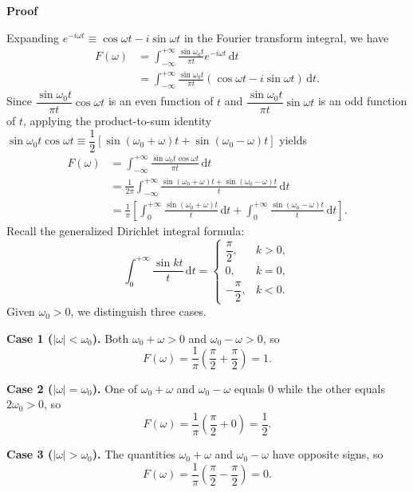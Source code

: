 \documentclass[11pt,a4paper]{article}
\theoremstyle{definition}
\theoremstyle{plain}
\begin{document}
\textbf{Proof}\par\nopagebreak[4]
Expanding $e^{-i\omega t} \equiv \cos \omega t - i\sin \omega t$ in the Fourier transform integral, we have
\begin{align*}
F(\omega) &= \int_{-\infty}^{+\infty} \frac{\sin \omega_0 t}{\pi t} e^{-i\omega t} \, \mathrm{d}t \\
&= \int_{-\infty}^{+\infty} \frac{\sin \omega_0 t}{\pi t} (\cos \omega t - i\sin \omega t) \, \mathrm{d}t.
\end{align*}
Since $\dfrac{\sin \omega_0 t}{\pi t} \cos \omega t$ is an even function of $t$ and $\dfrac{\sin \omega_0 t}{\pi t} \sin \omega t$ is an odd function of $t$, applying the product-to-sum identity $\sin \omega_0 t \cos \omega t \equiv \dfrac{1}{2}\left[\sin(\omega_0 + \omega)t + \sin(\omega_0 - \omega)t\right]$ yields
\begin{align*}
F(\omega) &= \int_{-\infty}^{+\infty} \frac{\sin \omega_0 t \cos \omega t}{\pi t} \, \mathrm{d}t \\
&= \frac{1}{2\pi} \int_{-\infty}^{+\infty} \frac{\sin(\omega_0 + \omega)t + \sin(\omega_0 - \omega)t}{t} \, \mathrm{d}t \\
&= \frac{1}{\pi} \left[ \int_{0}^{+\infty} \frac{\sin(\omega_0 + \omega)t}{t} \, \mathrm{d}t + \int_{0}^{+\infty} \frac{\sin(\omega_0 - \omega)t}{t} \, \mathrm{d}t \right].
\end{align*}
Recall the generalized Dirichlet integral formula:
\begin{equation}
\int_{0}^{+\infty} \frac{\sin kt}{t} \, \mathrm{d}t =
\begin{cases}
\dfrac{\pi}{2}, & k > 0, \\[10pt]
0, & k = 0, \\[8pt]
-\dfrac{\pi}{2}, & k < 0.
\end{cases}
\end{equation}
Given $\omega_0 > 0$, we distinguish three cases.

\textbf{Case 1 ($|\omega| < \omega_0$).} Both $\omega_0 + \omega > 0$ and $\omega_0 - \omega > 0$, so
\begin{equation}
F(\omega) = \frac{1}{\pi}\left(\frac{\pi}{2} + \frac{\pi}{2}\right) = 1.
\end{equation}

\textbf{Case 2 ($|\omega| = \omega_0$).} One of $\omega_0 + \omega$ and $\omega_0 - \omega$ equals $0$ while the other equals $2\omega_0 > 0$, so
\begin{equation}
F(\omega) = \frac{1}{\pi}\left(\frac{\pi}{2} + 0\right) = \frac{1}{2}.
\end{equation}

\textbf{Case 3 ($|\omega| > \omega_0$).} The quantities $\omega_0 + \omega$ and $\omega_0 - \omega$ have opposite signs, so
\begin{equation}
F(\omega) = \frac{1}{\pi}\left(\frac{\pi}{2} - \frac{\pi}{2}\right) = 0.
\end{equation}
\end{document}
